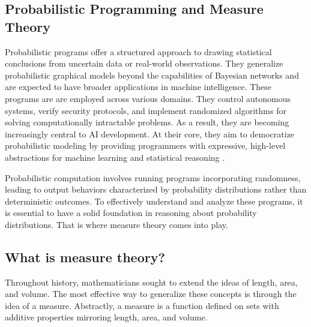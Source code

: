 \subsection{Probabilistic Programming and Measure Theory}


Probabilistic programs offer a structured approach to drawing statistical conclusions from uncertain data or real-world observations. They generalize probabilistic graphical models beyond the capabilities of Bayesian networks and are expected to have broader applications in machine intelligence. These programs are are employed across various domains. They control autonomous systems, verify security protocols, and implement randomized algorithms for solving computationally intractable problems. As a result, they are becoming increasingly central to AI development. At their core, they aim to democratize probabilistic modeling by providing programmers with expressive, high-level abstractions for machine learning and statistical reasoning \cite{bartheFoundationsProbabilisticProgramming2020}. 



Probabilistic computation involves running programs incorporating randomness, leading to output behaviors characterized by probability distributions rather than deterministic outcomes. To effectively understand and analyze these programs, it is essential to have a solid foundation in reasoning about probability distributions. That is where measure theory comes into play.

\subsection{What is measure theory?}

Throughout history, mathematicians sought to extend the ideas of length, area, and volume. The most effective way to generalize these concepts is through the idea of a measure. Abstractly, a measure is a function defined on sets with additive properties mirroring length, area, and volume.

